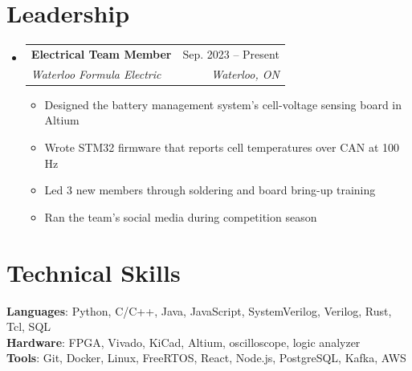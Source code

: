 \documentclass[letterpaper,11pt]{article}
\makeatletter
\newcommand{\resumeItem}[1]{\item\small{{#1 \vspace{-2pt}}}}
\newcommand{\resumeSubheading}[4]{
  \vspace{-2pt}\item
    \begin{tabular*}{0.97\textwidth}[t]{l@{\extracolsep{\fill}}r}
      \textbf{#1} & #2 \\
      \textit{\small#3} & \textit{\small #4} \\
    \end{tabular*}\vspace{-7pt}
}
\newcommand{\resumeSubHeadingListStart}{\begin{itemize}[leftmargin=0.15in, label={}]}
\newcommand{\resumeSubHeadingListEnd}{\end{itemize}}
\newcommand{\resumeItemListStart}{\begin{itemize}}
\newcommand{\resumeItemListEnd}{\end{itemize}\vspace{-5pt}}
\makeatother
\begin{document}
\section{Leadership}
  \resumeSubHeadingListStart
    \resumeSubheading
      {Electrical Team Member}{Sep. 2023 -- Present}
      {Waterloo Formula Electric}{Waterloo, ON}
      \resumeItemListStart
        \resumeItem{Designed the battery management system's cell-voltage sensing board in Altium}
        \resumeItem{Wrote STM32 firmware that reports cell temperatures over CAN at 100 Hz}
        \resumeItem{Led 3 new members through soldering and board bring-up training}
        \resumeItem{Ran the team's social media during competition season}
      \resumeItemListEnd
  \resumeSubHeadingListEnd

\section{Technical Skills}
 \begin{itemize}[leftmargin=0.15in, label={}]
    \small{\item{
     \textbf{Languages}{: Python, C/C++, Java, JavaScript, SystemVerilog, Verilog, Rust, Tcl, SQL} \\
     \textbf{Hardware}{: FPGA, Vivado, KiCad, Altium, oscilloscope, logic analyzer} \\
     \textbf{Tools}{: Git, Docker, Linux, FreeRTOS, React, Node.js, PostgreSQL, Kafka, AWS}
    }}
 \end{itemize}
\end{document}
